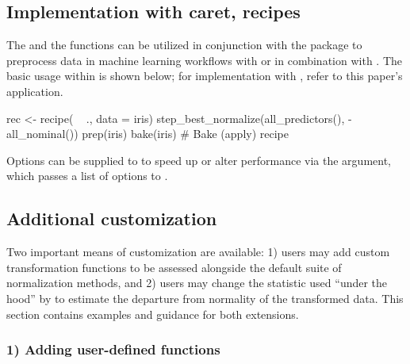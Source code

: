 \hypertarget{implementation-with-caret-recipes}{%
\subsection{Implementation with caret,
recipes}\label{implementation-with-caret-recipes}}

The  and the
 functions can be utilized in
conjunction with the  package to preprocess data in machine
learning workflows with  \citep{tidymodels} or in
combination with . The basic usage within  is
shown below; for implementation with , refer to this paper's
application.

\begin{Schunk}
\begin{Sinput}
rec <- recipe( ~ ., data = iris)  %
  step_best_normalize(all_predictors(), -all_nominal()) %
  prep(iris) %
  bake(iris)                                                # Bake (apply) recipe
\end{Sinput}
\end{Schunk}

Options can be supplied to
 to speed up or
alter performance via the 
argument, which passes a list of options to .

\hypertarget{additional-customization}{%
\subsection{Additional customization}\label{additional-customization}}

Two important means of customization are available: 1) users may add
custom transformation functions to be assessed alongside the default
suite of normalization methods, and 2) users may change the statistic
used ``under the hood'' by  to estimate the
departure from normality of the transformed data. This section contains
examples and guidance for both extensions.

\hypertarget{adding-user-defined-functions}{%
\subsubsection{1) Adding user-defined
functions}\label{adding-user-defined-functions}}

